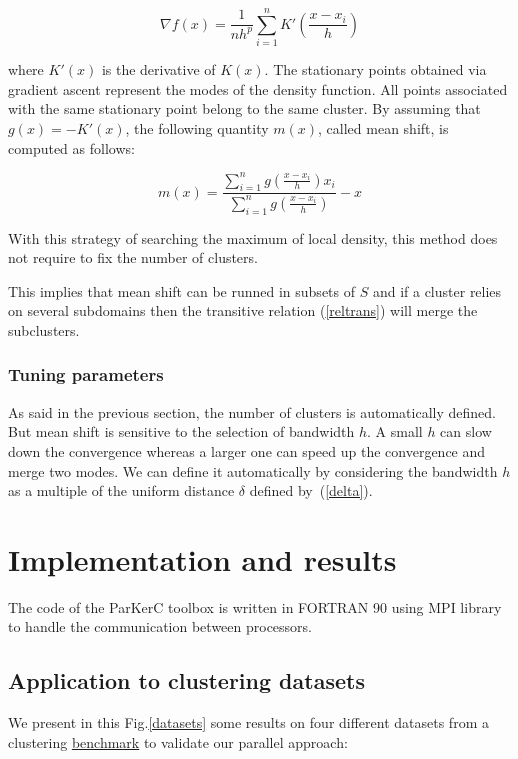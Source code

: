 \documentclass{llncs}
\begin{document}
\begin{equation}
  \nabla f(x)=\frac{1}{nh^p}\sum_{i=1}^n K'\left(\frac{x-x_i}{h}\right)
\end{equation}

where $K'(x)$ is the derivative of $K(x)$.  The stationary points obtained via
gradient ascent represent the modes of the density function. All points
associated with the same stationary point belong to the same cluster. By
assuming that $g(x)=-K'(x)$, the following quantity $m(x)$, called mean shift,
is computed as follows:

\begin{equation}
m(x)=\frac{\sum_{i=1}^n g\left(\frac{x-x_i}{h}\right)x_i}{\sum_{i=1}^n g\left(\frac{x-x_i}{h}\right)}-x
\end{equation}

With this strategy of searching the maximum of local density,  this method
does not require to fix the number of clusters. 

This implies that mean shift
can be runned in subsets of $S$ and if a cluster relies on several subdomains
then the transitive relation (\ref{reltrans}) will merge the subclusters.

\subsubsection{Tuning parameters}

As said in the previous section, the number of clusters is automatically
defined.  But mean shift is sensitive to the selection of bandwidth $h$.  A
small $h$ can slow down the convergence whereas a larger one can speed up the
convergence and merge two modes. We can define it automatically by considering
the bandwidth $h$ as a multiple of the uniform distance $\delta$ defined
by~(\ref{delta}).

\section{Implementation and results}

The code of the ParKerC toolbox is written in FORTRAN 90 using MPI library to
handle the communication between processors.

\subsection{Application to clustering datasets}

We present in this Fig.\ref{datasets} some results on four different datasets from a clustering \href{https://cs.joensuu.fi/sipu/datasets/}{benchmark} to validate our parallel approach: 
\end{document}
